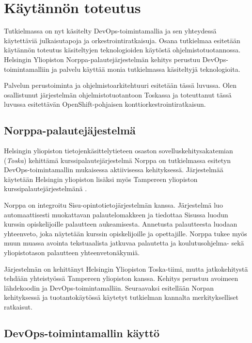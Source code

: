 \chapter{Käytännön toteutus\label{example}}

Tutkielmassa on nyt käsitelty DevOps-toimintamallia ja sen yhteydessä käytettäviä julkaisutapoja ja orkestrointiratkaisuja.
Osana tutkielmaa esitetään käytännön toteutus käsiteltyjen teknologioiden käytöstä ohjelmistotuotannossa.
Helsingin Yliopiston Norppa-palautejärjes\-telmän kehitys perustuu DevOps-toimintamalliin ja palvelu käyttää monia tutkielmassa käsiteltyjä teknologioita.

Palvelun perustoiminta ja ohjelmistoarkitehtuuri esitetään tässä luvussa.
Olen osallistunut järjestelmän ohjelmistotuotantoon Toskassa ja toteuttanut tässä luvussa esitettävän OpenShift-pohjaisen konttiorkestrointiratkaisun.

\section{Norppa-palautejäjestelmä}

Helsingin yliopiston tietojenkäsittelytieteen osaston sovelluskehitysakatemian (\textit{Toska}) \cite{Tenhunen23} kehittämä kurssipalautejärjestelmä Norppa on tutkielmassa esitetyn DevOps-toimintamal\-lin mukaisessa aktiivisessa kehityksessä.
Järjestelmää käytetään Helsingin yliopiston lisäksi myös Tampereen yliopiston kurssipalautejärjestelmänä \cite{Tampere23}.

Norppa on integroitu Sisu-opintotietojärjestelmän \cite{Laukka20} kanssa.
Järjestelmä luo automaattisesti muokattavan palautelomakkeen ja tiedottaa Sisussa luodun kurssin opiskelijoille palautteen aukeamisesta.
Annetusta palautteesta luodaan yhteenveto, joka näytetään kurssin opiskelijoille ja opettajille.
Norppa tukee myös muun muassa avointa tekstuaalista jatkuvaa palautetta ja koulutusohjelma- sekä yliopistotason palautteen yhteenvetonäkymiä.

Järjestelmän on kehittänyt Helsingin Yliopiston Toska-tiimi, mutta jatkokehitystä tehdään yhteistyössä Tampereen yliopiston kanssa.
Kehitys perustuu avoimeen lähdekoodin ja DevOps-toimintamalliin.
Seuraavaksi esitellään Norpan kehityksessä ja tuotantokäytössä käytetyt tutkielman kannalta merkitykselliset ratkaisut.

\section{DevOps-toimintamallin käyttö}

